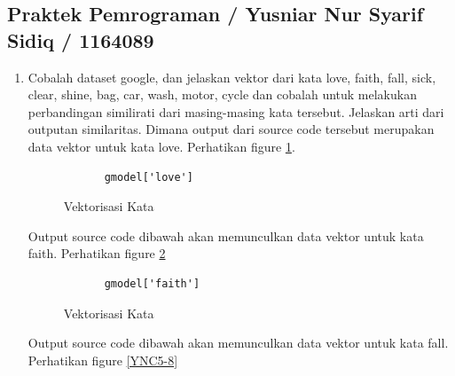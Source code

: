 \subsection{Praktek Pemrograman / Yusniar Nur Syarif Sidiq / 1164089}
\begin{enumerate}
\item Cobalah dataset google, dan jelaskan vektor dari kata love, faith, fall, sick, clear, shine, bag, car, wash, motor, cycle dan cobalah untuk melakukan perbandingan similirati dari masing-masing kata tersebut. Jelaskan arti dari outputan similaritas.
	\subitem Dimana output dari source code tersebut merupakan data vektor untuk kata love. Perhatikan figure \ref{YNC5-6}.

		\begin{verbatim}
			gmodel['love']
		\end{verbatim}

		\begin{figure}[ht]
			\caption{Vektorisasi Kata}
			\label{YNC5-6}
		\end{figure}

Output source code dibawah akan memunculkan data vektor untuk kata faith. Perhatikan figure \ref{YNC5-7}

		\begin{verbatim}
			gmodel['faith']
		\end{verbatim}

		\begin{figure}[ht]
			\caption{Vektorisasi Kata}
			\label{YNC5-7}
		\end{figure}

Output source code dibawah akan memunculkan data vektor untuk kata fall. Perhatikan figure \ref{YNC5-8}


\end{enumerate}
